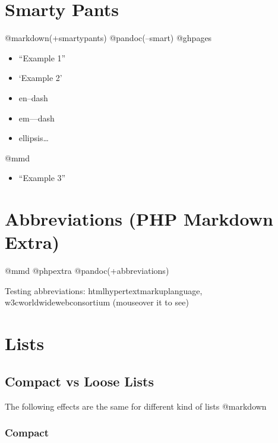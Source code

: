 \section{Smarty Pants}
\label{smartypants}

@markdown(+smartypants) @pandoc(--smart) @ghpages

\begin{itemize}
\item ``Example 1''

\item `Example 2'

\item en--dash

\item em---dash

\item ellipsis{\ldots}

\end{itemize}

@mmd

\begin{itemize}
\item ``Example 3''

\end{itemize}

\section{Abbreviations (PHP Markdown Extra)}
\label{abbreviationsphpmarkdownextra}

@mmd @phpextra @pandoc(+abbreviations)

Testing abbreviations: \ac{htmlhypertextmarkuplanguage}, \ac{w3cworldwidewebconsortium} (mouseover it to see)

\section{Lists}
\label{lists}

\subsection{Compact vs Loose Lists}
\label{compactvslooselists}

The following effects are the same for different kind of lists @markdown

\subsubsection{Compact}
\label{compact}

